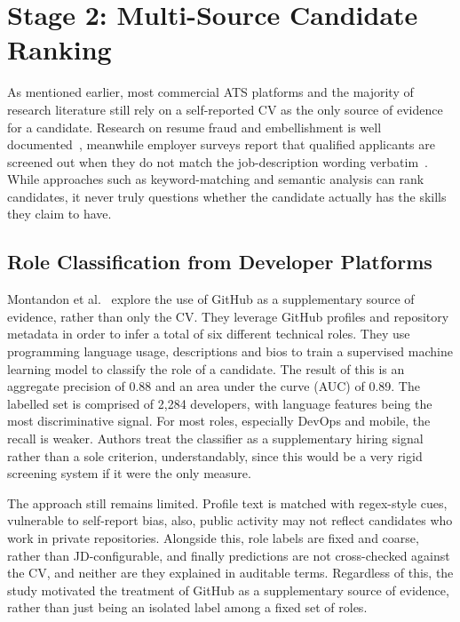 \section{Stage 2: Multi-Source Candidate Ranking}
\label{sec:lit-multi-source}

As mentioned earlier, most commercial ATS platforms and the majority of research literature still rely
on a self-reported CV as the only source of evidence for a candidate. Research on resume fraud and embellishment
is well documented~\cite{henle2019_resume_fraud,dunning2004}, meanwhile employer surveys report that qualified
applicants are screened out when they do not match the job-description wording verbatim~\cite{fuller2021hiddenworkers}.
While approaches such as keyword-matching and semantic analysis can rank candidates, it never truly
questions whether the candidate actually has the skills they claim to have.

\subsection{Role Classification from Developer Platforms}
Montandon et al.~\cite{montandon2021_roles} explore the use of GitHub as a supplementary source of evidence,
rather than only the CV. They leverage GitHub profiles and repository metadata in order to infer a 
total of six different technical roles. They use programming language usage, descriptions and bios
to train a supervised machine learning model to classify the role of a candidate. The result of this is 
an aggregate precision of 0.88 and an area under the curve (AUC) of 0.89. The labelled set is comprised
of 2,284 developers, with language features being the most discriminative signal.
For most roles, especially DevOps and mobile, the recall is weaker. Authors treat the classifier as a 
supplementary hiring signal rather than a sole criterion, understandably, since this would be a very rigid 
screening system if it were the only measure.

The approach still remains limited. Profile text is matched with regex-style cues, vulnerable to 
self-report bias, also, public activity may not reflect candidates who work in private repositories.
Alongside this, role labels are fixed and coarse, rather than JD-configurable, and finally predictions
are not cross-checked against the CV, and neither are they explained in auditable terms.
Regardless of this, the study motivated the treatment of GitHub as a supplementary source of evidence,
rather than just being an isolated label among a fixed set of roles.


